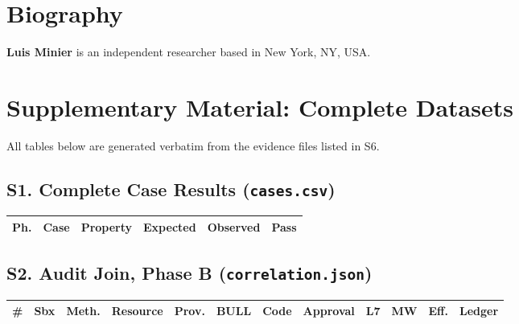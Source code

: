 \documentclass[journal]{IEEEtran}
\newcommand{\bull}{\textsc{BULL}}
\begin{document}
\section*{Biography}
\begingroup\footnotesize
\noindent\textbf{Luis Minier} is an independent researcher based in New York, NY, USA.\par
\endgroup

\onecolumn
\section*{Supplementary Material: Complete Datasets}
All tables below are generated verbatim from the evidence files listed in S6.

\subsection*{S1. Complete Case Results (\texttt{cases.csv})}
\scriptsize
\begin{longtable}{|p{0.3cm}|p{0.7cm}|p{2.6cm}|p{2.2cm}|p{8.0cm}|p{0.5cm}|}
\hline
\textbf{Ph.} & \textbf{Case} & \textbf{Property} & \textbf{Expected} & \textbf{Observed} & \textbf{Pass} \\ \hline
\endhead

\end{longtable}

\normalsize
\subsection*{S2. Audit Join, Phase B (\texttt{correlation.json})}
\scriptsize
\setlength{\tabcolsep}{3pt}
\begin{longtable}{rllp{2.9cm}llp{1.9cm}p{2.4cm}llll}
\toprule
\# & \textbf{Sbx} & \textbf{Meth.} & \textbf{Resource} & \textbf{Prov.} & \textbf{\bull{}} & \textbf{Code} & \textbf{Approval} & \textbf{L7} & \textbf{MW} & \textbf{Eff.} & \textbf{Ledger} \\
\midrule
\endhead

\end{longtable}

\normalsize
\setlength{\tabcolsep}{6pt}
\end{document}
